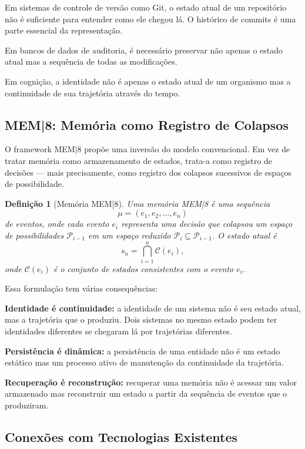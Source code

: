 \documentclass[11pt, a4paper]{article}
\theoremstyle{named}
\newtheorem{definicao}{Definição}
\begin{document}
Em sistemas de controle de versão como Git, o estado atual de um
repositório não é suficiente para entender como ele chegou lá. O
histórico de commits é uma parte essencial da representação.

Em bancos de dados de auditoria, é necessário preservar não apenas o
estado atual mas a sequência de todas as modificações.

Em cognição, a identidade não é apenas o estado atual de um organismo
mas a continuidade de sua trajetória através do tempo.

\subsection{MEM|8: Memória como Registro de Colapsos}

O framework MEM|8 propõe uma inversão do modelo convencional. Em vez de
tratar memória como armazenamento de estados, trata-a como registro de
decisões — mais precisamente, como registro dos colapsos sucessivos de
espaços de possibilidade.

\begin{definicao}[Memória MEM|8]
Uma memória MEM|8 é uma sequência
\[
  \mu = (e_1, e_2, \ldots, e_n)
\]
de eventos, onde cada evento $e_i$ representa uma decisão que colapsou
um espaço de possibilidades $\mathcal{P}_{i-1}$ em um espaço reduzido
$\mathcal{P}_i \subseteq \mathcal{P}_{i-1}$. O estado atual é
\[
  s_n = \bigcap_{i=1}^n \mathcal{C}(e_i),
\]
onde $\mathcal{C}(e_i)$ é o conjunto de estados consistentes com o
evento $e_i$.
\end{definicao}

Essa formulação tem várias consequências:

\textbf{Identidade é continuidade:} a identidade de um sistema não é
seu estado atual, mas a trajetória que o produziu. Dois sistemas no
mesmo estado podem ter identidades diferentes se chegaram lá por
trajetórias diferentes.

\textbf{Persistência é dinâmica:} a persistência de uma entidade não é
um estado estático mas um processo ativo de manutenção da continuidade
da trajetória.

\textbf{Recuperação é reconstrução:} recuperar uma memória não é
acessar um valor armazenado mas reconstruir um estado a partir da
sequência de eventos que o produziram.

\subsection{Conexões com Tecnologias Existentes}
\end{document}
